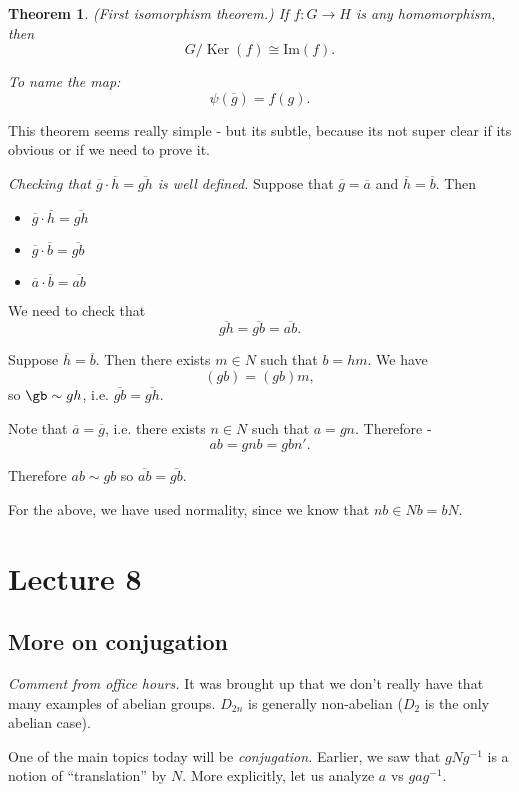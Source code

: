 \documentclass[12pt]{article}
\newtheorem*{theorem}{Theorem}
\newcommand{\ol}{\overline}
\DeclareMathOperator{\Ker}{Ker}
\begin{document}
\begin{theorem} (First isomorphism theorem.)  If $f: G \to H$ is any homomorphism, then
  \[
    G / \Ker(f) \cong \text{Im}(f).
  \]

  To name the map:
  \[
    \psi(\ol{g}) = f(g).
  \] 
\end{theorem}

This theorem seems really simple - but its subtle, because its not super clear if its obvious or if we need to prove it.

{\it Checking that $\ol{g} \cdot \ol{h} = \ol{gh}$ is well defined.}  Suppose that $\ol{g} = \ol{a}$ and $\ol{h} = \ol{b}$.  Then 

\begin{itemize}
  \item $\ol{g} \cdot \ol{h} = \ol{gh}$
  \item $\ol{g} \cdot \ol{b} = \ol{gb}$
  \item $\ol{a} \cdot \ol{b} = \ol{ab}$
\end{itemize}

We need to check that
\[
  \ol{gh} = \ol{gb} = \ol{ab}.
\]

Suppose $\ol{h} = \ol{b}$.  Then there exists $m \in N$ such that $b = hm$.  We have
\[
  (gb) = (gb)m,
\]
so $\gb \sim gh$, i.e. $\ol{gb} = \ol{gh}$.

Note that $\ol{a} = \ol{g}$, i.e. there exists $n \in N$ such that $a = gn$.   Therefore - 
\[
  ab = gnb = gbn'.
\]

Therefore $ab \sim gb$ so $\ol{ab} = \ol{gb}$.

For the above, we have used normality, since we know that $nb \in Nb = bN$.

\section{Lecture 8}

\subsection{More on conjugation}

{\it Comment from office hours.} It was brought up that we don't really have that many examples of abelian groups.  $D_{2n}$ is generally non-abelian ($D_2$ is the only abelian case).

One of the main topics today will be {\it conjugation.}  Earlier, we saw that $gNg^{-1}$ is a notion of ``translation'' by $N$.  More explicitly, let us analyze $a$ vs $g a g^{-1}$.  
\end{document}
